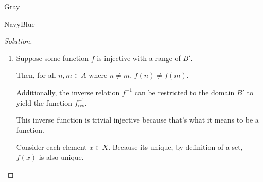 \documentclass[12pt]{amsart}
\theoremstyle{named}
\newenvironment{soln}
{\begin{color}{Gray}\begin{framed}\begin{color}{NavyBlue}\begin{proof}[Solution]
\doublespacing}
{\end{proof}\end{color}\end{framed}\end{color}}
\theoremstyle{definition}
\begin{document}
\begin{soln}
	\phantom{ }
    
    \begin{enumerate}
        \item 
        \phantom{ }

        \noindent Suppose some function $f$ is injective with a range of $B'$.

        \noindent Then, for all $n,m \in A$ where $n \neq m$, $f(n) \neq f(m)$.

        \noindent Additionally, the inverse relation $f^{-1}$ can be restricted
        to the domain $B'$ to yield the function $f^{-1}_\text{res}$. 
        
        \noindent This inverse function is trivial injective because
        that's what it means to be a function.
        
        \noindent Consider each element $x \in X$. Because its unique, by definition
        of a set, $f(x)$ is also unique. 
    \end{enumerate}
\end{soln}
\end{document}
